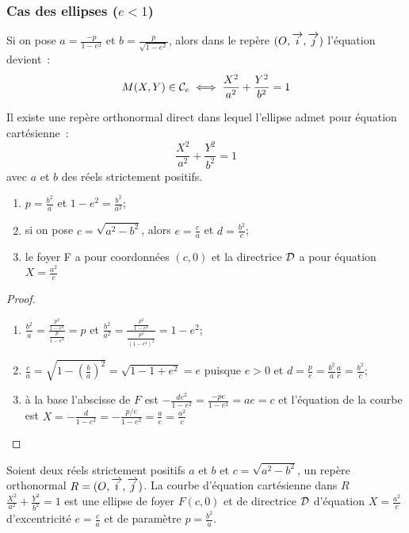 \subsubsection{Cas des ellipses (\(e<1\))}
Si on pose \(a = \frac{-p}{1-e^2}\) et \(b = \frac{p}{\sqrt{1-e^2}}\), alors dans le
repère \((O,\overrightarrow{i},\overrightarrow{j})\) l'équation devient~:
\begin{equation}
  M(X, Y) \in \mathcal{C}_{e} \iff \frac{X^2}{a^2} + \frac{Y^2}{b^2} = 1
\end{equation}
\begin{theo}
  Il existe une repère orthonormal direct dans lequel l'ellipse admet pour
  équation cartésienne~:
  \begin{equation}
    \frac{X^2}{a^2} + \frac{Y^2}{b^2} = 1
  \end{equation}
  avec \(a\) et \(b\) des réels strictement positifs.
\end{theo}
\begin{prop}
  \begin{enumerate}
    \item \(p = \frac{b^2}{a}\) et \(1-e^2 = \frac{b^2}{a^2}\);
    \item si on pose \(c = \sqrt{a^2-b^2}\), alors \(e = \frac{c}{a}\) et
      \(d = \frac{b^2}{c}\);
    \item le foyer F a pour coordonnées \((c, 0)\) et la directrice \(\mathcal{D}\) a
      pour équation \(X = \frac{a^2}{c}\)
  \end{enumerate}
\end{prop}
\begin{proof}
  \begin{enumerate}
    \item \(\frac{b^2}{a} = \frac{\frac{p^2}{1-e^2}}{\frac{p}{1-e^2}} = p\) et
      \(\frac{b^2}{a^2} = \frac{\frac{p^2}{1-e^2}}{\frac{p^2}{(1-e^2)^2}} = 1-e^2\);
    \item \(\frac{c}{a} = \sqrt{1-\left(\frac{b}{a}\right)^2} = \sqrt{1-1 + e^2} = e\)
      puisque \(e>0\) et \(d = \frac{p}{e} = \frac{b^2}{a}
      \frac{a}{c} = \frac{b^2}{c}\);
    \item à la base l'abscisse de \(F\) est
      \(-\frac{de^2}{1-e^2} = \frac{-pe}{1-e^2} = ae = c\) et l'équation de la courbe
      est \(X = -\frac{d}{1-e^2} = -\frac{p/e}{1-e^2} = \frac{a}{e} = \frac{a^2}{c}\)
  \end{enumerate}
\end{proof}
\begin{theo}
  Soient deux réels strictement positifs \(a\) et \(b\) et \(c = \sqrt{a^2-b^2}\),
  un repère orthonormal \(R = (O,\overrightarrow{i},\overrightarrow{j})\). La courbe d'équation cartésienne dans \(R\)
  \(\frac{X^2}{a^2} + \frac{Y^2}{b^2} = 1\) est une ellipse de foyer \(F(c, 0)\) et
  de directrice \(\mathcal{D}\) d'équation \(X = \frac{a^2}{c}\) d'excentricité
  \(e = \frac{c}{a}\) et de paramètre \(p = \frac{b^2}{a}\).
\end{theo}
